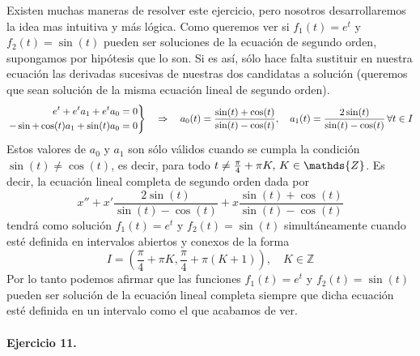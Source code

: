 \documentclass[fleqn]{article}
\def\Z{\mathds{Z}}
\begin{document}
Existen muchas maneras de resolver este ejercicio, pero nosotros desarrollaremos la idea mas intuitiva y más lógica. Como queremos ver si $f_1(t) = e^t$ y $f_2(t)=\sin (t)$
pueden ser soluciones de la ecuación de segundo orden, supongamos por hipótesis que lo son. Si es así, sólo hace falta sustituir en nuestra ecuación 
las derivadas sucesivas de nuestras dos candidatas a solución (queremos que sean solución de la misma ecuación lineal de segundo orden).
\begin{equation*}
    \left.
    \begin{aligned}
        e^t + e^ta_1 + e^t a_0 = 0 \\
        -\sin + \cos(t)a_1 + \sin(t)a_0=0
    \end{aligned}
    \right\} \quad \Rightarrow \quad a_0(t)=\frac{\sin(t) + \cos(t)}{\sin(t) - \cos(t)}, \quad a_1(t)=\frac{2\sin(t)}{\sin(t) - \cos(t)} \thinspace \forall t \in I
\end{equation*}
Estos valores de $a_0$ y $a_1$ son sólo válidos cuando se cumpla la condición $\sin(t) \neq \cos(t)$, es decir, para todo $t \neq \frac{\pi}{4} + \pi K, \thinspace K \in \Z$.
Es decir, la ecuación lineal completa de segundo orden dada por 
$$x'' + x'\frac{2\sin(t)}{\sin(t) - \cos(t)} + x\frac{\sin(t) + \cos(t)}{\sin(t) - \cos(t)}$$
tendrá como solución $f_1(t) = e^t$ y $f_2(t)=\sin (t)$ simultáneamente cuando esté definida en intervalos abiertos y conexos de la forma 
$$I = \left(\frac{\pi}{4} + \pi K, \frac{\pi}{4} + \pi (K+1)\right), \quad K \in \Z$$
Por lo tanto podemos afirmar que las funciones $f_1(t) = e^t$ y $f_2(t)=\sin (t)$ pueden ser solución de la ecuación lineal completa siempre que dicha ecuación
esté definida en un intervalo como el que acabamos de ver.\\ \\

\textbf{Ejercicio 11.} \\
\end{document}

